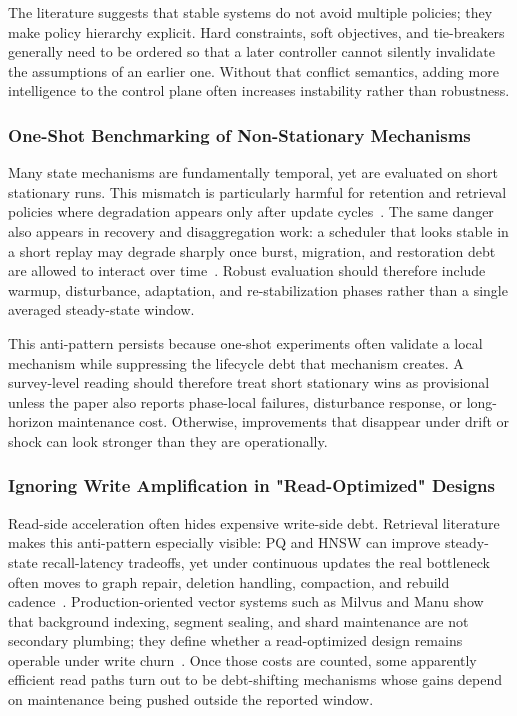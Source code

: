 \documentclass[acmsmall,screen,review]{acmart}
\begin{document}
The literature suggests that stable systems do not avoid multiple policies; they make policy hierarchy explicit. Hard constraints, soft objectives, and tie-breakers generally need to be ordered so that a later controller cannot silently invalidate the assumptions of an earlier one. Without that conflict semantics, adding more intelligence to the control plane often increases instability rather than robustness.

\subsubsection{One-Shot Benchmarking of Non-Stationary Mechanisms}

Many state mechanisms are fundamentally temporal, yet are evaluated on short stationary runs. This mismatch is particularly harmful for retention and retrieval policies where degradation appears only after update cycles~\cite{zhou2025ferret,zhang2026flowrag}. The same danger also appears in recovery and disaggregation work: a scheduler that looks stable in a short replay may degrade sharply once burst, migration, and restoration debt are allowed to interact over time~\cite{zhao2024recovery,nian2026cacheflow}. Robust evaluation should therefore include warmup, disturbance, adaptation, and re-stabilization phases rather than a single averaged steady-state window.

This anti-pattern persists because one-shot experiments often validate a local mechanism while suppressing the lifecycle debt that mechanism creates. A survey-level reading should therefore treat short stationary wins as provisional unless the paper also reports phase-local failures, disturbance response, or long-horizon maintenance cost. Otherwise, improvements that disappear under drift or shock can look stronger than they are operationally.

\subsubsection{Ignoring Write Amplification in "Read-Optimized" Designs}

Read-side acceleration often hides expensive write-side debt. Retrieval literature makes this anti-pattern especially visible: PQ and HNSW can improve steady-state recall-latency tradeoffs, yet under continuous updates the real bottleneck often moves to graph repair, deletion handling, compaction, and rebuild cadence~\cite{jegou2011pq,malkov2020hnsw,singh2021freshdiskann,xu2023spfresh,xu2025place}. Production-oriented vector systems such as Milvus and Manu show that background indexing, segment sealing, and shard maintenance are not secondary plumbing; they define whether a read-optimized design remains operable under write churn~\cite{wang2021milvus,guo2022manu}. Once those costs are counted, some apparently efficient read paths turn out to be debt-shifting mechanisms whose gains depend on maintenance being pushed outside the reported window.
\end{document}
